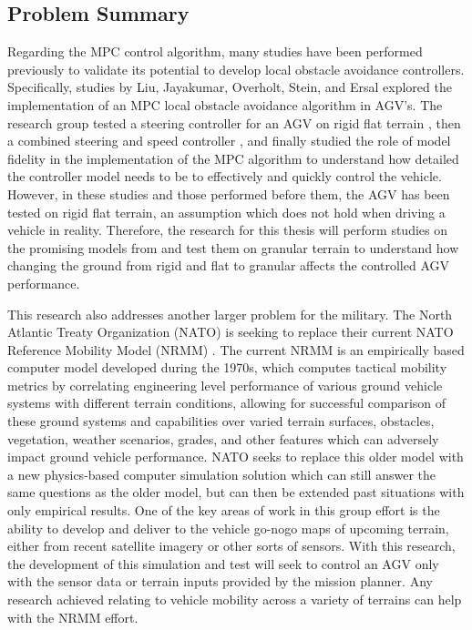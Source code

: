 \documentclass[12pt,onecolumn]{article}
\begin{document}

\subsection{Problem Summary}\label{ss:ProblemSummary}

Regarding the MPC control algorithm, many studies have been performed previously to validate its potential to develop local obstacle avoidance controllers. Specifically, studies by Liu, Jayakumar, Overholt, Stein, and Ersal explored the implementation of an MPC local obstacle avoidance algorithm in AGV’s. The research group tested a steering controller for an AGV on rigid flat terrain \cite{ModelFidelity2013}, then a combined steering and speed controller \cite{SpeedSteer2015}, and finally studied the role of model fidelity in the implementation of the MPC algorithm \cite{ModelFidelity2016} to understand how detailed the controller model needs to be to effectively and quickly control the vehicle. However, in these studies and those performed before them, the AGV has been tested on rigid flat terrain, an assumption which does not hold when driving a vehicle in reality. Therefore, the research for this thesis will perform  studies on the promising models from \cite{ModelFidelity2016} and test them on granular terrain to understand how changing the ground from rigid and flat to granular affects the controlled AGV performance.

This research also addresses another larger problem for the military. The North Atlantic Treaty Organization (NATO) is seeking to replace their current NATO Reference Mobility Model (NRMM) \cite{NATONRMM}. The current NRMM is an empirically based computer model developed during the 1970s, which computes tactical mobility metrics by correlating engineering level performance of various ground vehicle systems with different terrain conditions, allowing for successful comparison of these ground systems and capabilities over varied terrain surfaces, obstacles, vegetation, weather scenarios, grades, and other features which can adversely impact ground vehicle performance. NATO seeks to replace this older model with a new physics-based computer simulation solution which can still answer the same questions as the older model, but can then be extended past situations with only empirical results. One of the key areas of work in this group effort is the ability to develop and deliver to the vehicle go-nogo maps of upcoming terrain, either from recent satellite imagery or other sorts of sensors. With this research, the development of this simulation and test will seek to control an AGV only with the sensor data or terrain inputs provided by the mission planner. Any research achieved relating to vehicle mobility across a variety of terrains can help with the NRMM effort. 
\end{document}
